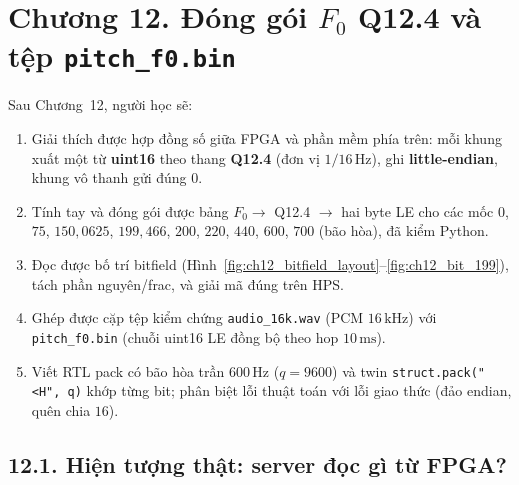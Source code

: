 \clearpage
{}
\section*{Chương 12. Đóng gói $F_0$ Q12.4 và tệp \texttt{pitch\_f0.bin}}

\begin{learningobj}
Sau Chương~12, người học sẽ:
\begin{enumerate}[leftmargin=1.4em]
    \item Giải thích được hợp đồng số giữa FPGA và phần mềm phía trên: mỗi khung xuất một từ \textbf{uint16} theo thang \textbf{Q12.4} (đơn vị $1/16\,\text{Hz}$), ghi \textbf{little-endian}, khung vô thanh gửi đúng $0$.
    \item Tính tay và đóng gói được bảng $F_0\to$ Q12.4 $\to$ hai byte LE cho các mốc $0$, $75$, $150{,}0625$, $199{,}466$, $200$, $220$, $440$, $600$, $700$ (bão hòa), đã kiểm Python.
    \item Đọc được bố trí bitfield (Hình~\ref{fig:ch12_bitfield_layout}--\ref{fig:ch12_bit_199}), tách phần nguyên/frac, và giải mã đúng trên HPS.
    \item Ghép được cặp tệp kiểm chứng \texttt{audio\_16k.wav} (PCM $16\,\text{kHz}$) với \texttt{pitch\_f0.bin} (chuỗi uint16 LE đồng bộ theo hop $10\,\text{ms}$).
    \item Viết RTL pack có bão hòa trần $600\,\text{Hz}$ ($q=9600$) và twin \texttt{struct.pack("<H", q)} khớp từng bit; phân biệt lỗi thuật toán với lỗi giao thức (đảo endian, quên chia $16$).
\end{enumerate}
\end{learningobj}

\subsection*{12.1. Hiện tượng thật: server đọc gì từ FPGA?}

